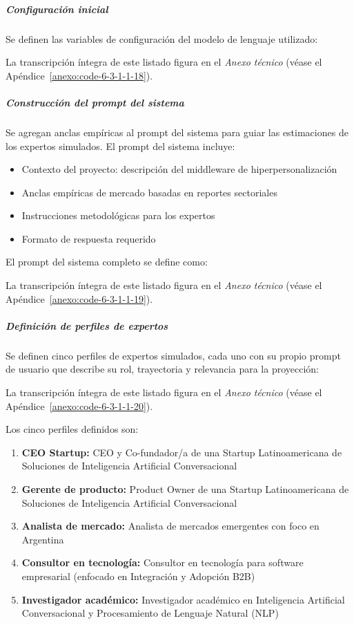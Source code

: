 \subparagraph{Configuración inicial}

Se definen las variables de configuración del modelo de lenguaje utilizado:

La transcripción íntegra de este listado figura en el \textit{Anexo técnico} (véase el Apéndice~\ref{anexo:code-6-3-1-1-18}).

\subparagraph{Construcción del prompt del sistema}

Se agregan anclas empíricas al prompt del sistema para guiar las estimaciones de los expertos simulados. El prompt del sistema incluye:

\begin{itemize}
    \item Contexto del proyecto: descripción del middleware de hiperpersonalización
    \item Anclas empíricas de mercado basadas en reportes sectoriales
    \item Instrucciones metodológicas para los expertos
    \item Formato de respuesta requerido
\end{itemize}

El prompt del sistema completo se define como:

La transcripción íntegra de este listado figura en el \textit{Anexo técnico} (véase el Apéndice~\ref{anexo:code-6-3-1-1-19}).

\subparagraph{Definición de perfiles de expertos}

Se definen cinco perfiles de expertos simulados, cada uno con su propio prompt de usuario que describe su rol, trayectoria y relevancia para la proyección:

La transcripción íntegra de este listado figura en el \textit{Anexo técnico} (véase el Apéndice~\ref{anexo:code-6-3-1-1-20}).

Los cinco perfiles definidos son:
\begin{enumerate}
    \item \textbf{CEO Startup:} CEO y Co-fundador/a de una Startup Latinoamericana de Soluciones de Inteligencia Artificial Conversacional
    \item \textbf{Gerente de producto:} Product Owner de una Startup Latinoamericana de Soluciones de Inteligencia Artificial Conversacional
    \item \textbf{Analista de mercado:} Analista de mercados emergentes con foco en Argentina
    \item \textbf{Consultor en tecnología:} Consultor en tecnología para software empresarial (enfocado en Integración y Adopción B2B)
    \item \textbf{Investigador académico:} Investigador académico en Inteligencia Artificial Conversacional y Procesamiento de Lenguaje Natural (NLP)
\end{enumerate}

